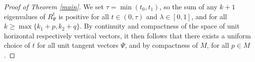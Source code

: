 \begin{proof}[Proof of Theorem \ref{main}]
	We set $\tau=\min(t_0,t_1)$, so the sum of any $k+1$ eigenvalues of $R_\Psi^t$ is positive for all $t\in(0,\tau)$ and $\lambda\in[0,1]$, and for all $k\geq \max\{k_1+p,k_2+q\}$. By continuity and compactness of the space of unit horizontal respectively vertical vectors, it then follows that there exists a uniform choice of $t$ for all unit tangent vectors $\Psi$, and by compactness of $M$, for all $p\in M$.
\end{proof}
